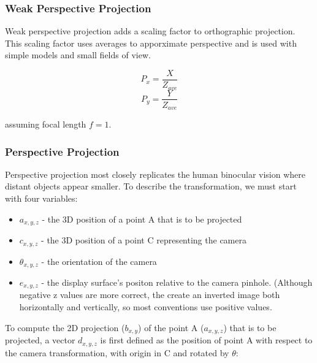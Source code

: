 \documentclass{article}
\begin{document}
\subsubsection{Weak Perspective Projection}
Weak perspective projection adds a scaling factor to orthographic projection. This scaling factor uses averages to apporximate perspective and is used with simple models and small fields of view.

  \[P_{x} =  \frac{X}{Z_{ave}}\]
  \[P_{y} =  \frac{Y}{Z_{ave}}\]

assuming focal length $f = 1$.

\subsubsection{Perspective Projection}
Perspective projection most closely replicates the human binocular vision where distant objects appear smaller. To describe the transformation, we must start with four variables:

\begin{itemize}
  \item $a_{x, y, z}$ - the 3D position of a point A that is to be projected
  \item $c_{x, y, z}$ - the 3D position of a point C representing the camera
  \item $\theta_{x, y, z}$ - the orientation of the camera
  \item $e_{x, y, z}$ - the display surface's positon relative to the camera pinhole. (Although negative z values are more correct, the create an inverted image both horizontally and vertically, so most conventions use positive values.
\end{itemize}

To compute the 2D projection ($b_{x, y}$) of the point A ($a_{x, y, z}$) that is to be projected, a vector $d_{x, y, z}$ is first defined as the position of point A with respect to the camera transformation, with origin in C and rotated by $\theta$:
\end{document}
